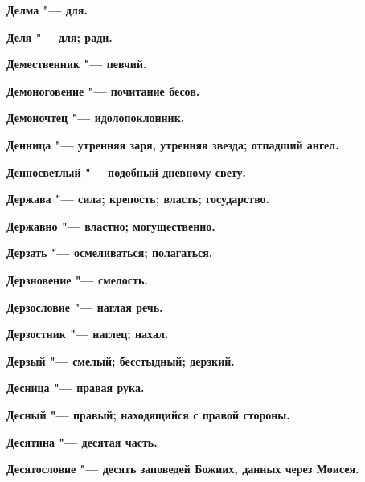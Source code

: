 \begin{multicols}{2}
\bfseries Делма\normalfont{} "--- для. 




\bfseries Деля\normalfont{} "--- для; ради. 




\bfseries Демественник\normalfont{} "--- певчий. 




\bfseries Демоноговение\normalfont{} "--- почитание бесов. 




\bfseries Демоночтец\normalfont{} "--- идолопоклонник. 




\bfseries Денница\normalfont{} "--- утренняя заря, утренняя звезда; отпадший ангел. 




\bfseries Денносветлый\normalfont{} "--- подобный дневному свету. 




\bfseries Держава\normalfont{} "--- сила; крепость; власть; государство. 




\bfseries Державно\normalfont{} "--- властно; могущественно. 




\bfseries Дерзать\normalfont{} "--- осмеливаться; полагаться. 




\bfseries Дерзновение\normalfont{} "--- смелость. 




\bfseries Дерзословие\normalfont{} "--- наглая речь. 




\bfseries Дерзостник\normalfont{} "--- наглец; нахал. 




\bfseries Дерзый\normalfont{} "--- смелый; бесстыдный; дерзкий. 




\bfseries Десница\normalfont{} "--- правая рука. 




\bfseries Десный\normalfont{} "--- правый; находящийся с правой стороны. 




\bfseries Десятина\normalfont{} "--- десятая часть. 




\bfseries Десятословие\normalfont{} "--- десять заповедей Божиих, данных через Моисея. 





\end{multicols}
